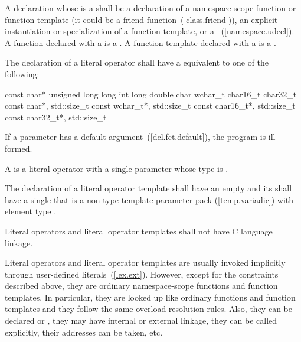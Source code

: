 \pnum
A declaration whose  is a
 shall be a declaration of a namespace-scope
function or function template (it could be a friend
function~(\ref{class.friend})), an explicit instantiation or specialization of a
function template, or a ~(\ref{namespace.udecl}).
A function declared with a  is a . A function template declared with a 
is a .

\pnum
The declaration of a literal operator shall have a
 equivalent to one of the following:

\begin{codeblock}
const char*
unsigned long long int
long double
char
wchar_t
char16_t
char32_t
const char*, std::size_t
const wchar_t*, std::size_t
const char16_t*, std::size_t
const char32_t*, std::size_t
\end{codeblock}

If a parameter has a default argument~(\ref{dcl.fct.default}), the program is
ill-formed.

\pnum
A  is a literal operator with a single parameter
whose type is .

\pnum
The declaration of a literal operator template shall have an empty
 and its
 shall have a single
 that is a non-type template parameter
pack (\ref{temp.variadic}) with element type .

\pnum
Literal operators and literal operator templates shall not have C language linkage.

\pnum
\enternote Literal operators and literal operator templates are usually invoked
implicitly through user-defined literals~(\ref{lex.ext}). However, except for
the constraints described above, they are ordinary namespace-scope functions and
function templates. In particular, they are looked up like ordinary functions
and function templates and they follow the same overload resolution rules. Also,
they can be declared  or , they may have internal
or external linkage, they can be called explicitly, their addresses can be
taken, etc. \exitnote

